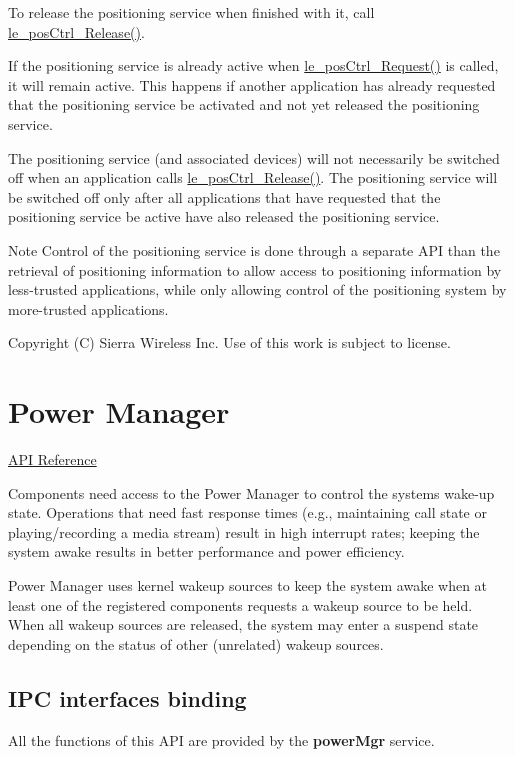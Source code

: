 To release the positioning service when finished with it, call \hyperlink{le__pos_ctrl__interface_8h_a5dfa743e5d134b265b883f7106846428}{le\+\_\+pos\+Ctrl\+\_\+\+Release()}.

If the positioning service is already active when \hyperlink{le__pos_ctrl__interface_8h_ab0522cfb23a7b34863b7bd9475d38255}{le\+\_\+pos\+Ctrl\+\_\+\+Request()} is called, it will remain active. This happens if another application has already requested that the positioning service be activated and not yet released the positioning service.

The positioning service (and associated devices) will not necessarily be switched off when an application calls \hyperlink{le__pos_ctrl__interface_8h_a5dfa743e5d134b265b883f7106846428}{le\+\_\+pos\+Ctrl\+\_\+\+Release()}. The positioning service will be switched off only after all applications that have requested that the positioning service be active have also released the positioning service.

\begin{DoxyNote}{Note}
Control of the positioning service is done through a separate A\+P\+I than the retrieval of positioning information to allow access to positioning information by less-\/trusted applications, while only allowing control of the positioning system by more-\/trusted applications.
\end{DoxyNote}




Copyright (C) Sierra Wireless Inc. Use of this work is subject to license. \hypertarget{c_pm}{}\section{Power Manager}\label{c_pm}
\hyperlink{le__pm__interface_8h}{A\+P\+I Reference}





Components need access to the Power Manager to control the system\textquotesingle{}s wake-\/up state. Operations that need fast response times (e.\+g., maintaining call state or playing/recording a media stream) result in high interrupt rates; keeping the system awake results in better performance and power efficiency.

Power Manager uses kernel wakeup sources to keep the system awake when at least one of the registered components requests a wakeup source to be held. When all wakeup sources are released, the system may enter a suspend state depending on the status of other (unrelated) wakeup sources.\hypertarget{c_pm_le_pm_binding}{}\subsection{I\+P\+C interfaces binding}\label{c_pm_le_pm_binding}
All the functions of this A\+P\+I are provided by the {\bfseries power\+Mgr} service.

